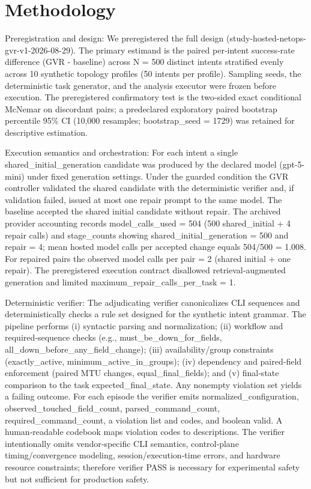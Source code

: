 \documentclass[conference]{IEEEtran}
\begin{document}
\section{Methodology}
Preregistration and design: We preregistered the full design (study-hosted-netops-gvr-v1-2026-08-29). The primary estimand is the paired per‑intent success‑rate difference (GVR - baseline) across N = 500 distinct intents stratified evenly across 10 synthetic topology profiles (50 intents per profile). Sampling seeds, the deterministic task generator, and the analysis executor were frozen before execution. The preregistered confirmatory test is the two‑sided exact conditional McNemar on discordant pairs; a predeclared exploratory paired bootstrap percentile 95\% CI (10,000 resamples; bootstrap\_seed = 1729) was retained for descriptive estimation.

Execution semantics and orchestration: For each intent a single shared\_initial\_generation candidate was produced by the declared model (gpt-5-mini) under fixed generation settings. Under the guarded condition the GVR controller validated the shared candidate with the deterministic verifier and, if validation failed, issued at most one repair prompt to the same model. The baseline accepted the shared initial candidate without repair. The archived provider accounting records model\_calls\_used = 504 (500 shared\_initial + 4 repair calls) and stage\_counts showing shared\_initial\_generation = 500 and repair = 4; mean hosted model calls per accepted change equals 504/500 = 1.008. For repaired pairs the observed model calls per pair = 2 (shared initial + one repair). The preregistered execution contract disallowed retrieval‑augmented generation and limited maximum\_repair\_calls\_per\_task = 1.

Deterministic verifier: The adjudicating verifier canonicalizes CLI sequences and deterministically checks a rule set designed for the synthetic intent grammar. The pipeline performs (i) syntactic parsing and normalization; (ii) workflow and required‑sequence checks (e.g., must\_be\_down\_for\_fields, all\_down\_before\_any\_field\_change); (iii) availability/group constraints (exactly\_active, minimum\_active\_in\_groups); (iv) dependency and paired‑field enforcement (paired MTU changes, equal\_final\_fields); and (v) final‑state comparison to the task expected\_final\_state. Any nonempty violation set yields a failing outcome. For each episode the verifier emits normalized\_configuration, observed\_touched\_field\_count, parsed\_command\_count, required\_command\_count, a violation list and codes, and boolean valid. A human‑readable codebook maps violation codes to descriptions. The verifier intentionally omits vendor‑specific CLI semantics, control‑plane timing/convergence modeling, session/execution‑time errors, and hardware resource constraints; therefore verifier PASS is necessary for experimental safety but not sufficient for production safety.
\end{document}
